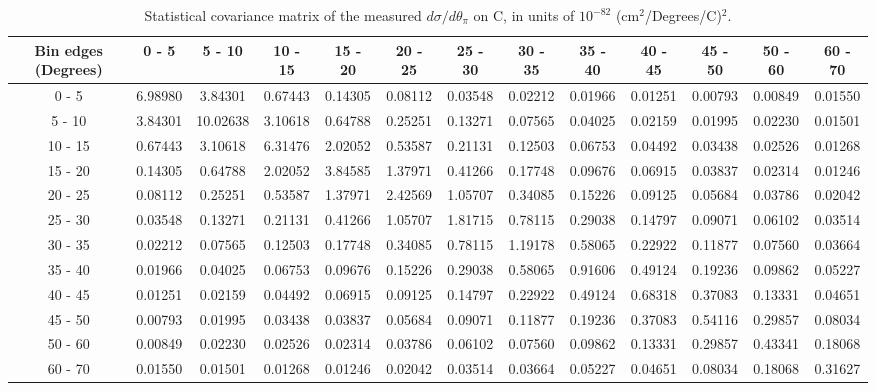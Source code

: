 \documentclass[aps,prl,twocolumn,superscriptaddress,nofootinbib]{revtex4-1}
\begin{document}
\begin{turnpage}
 \begin{table}[h!]
  \centering
  \caption{Statistical covariance matrix of the measured $d\sigma/d\theta_{\pi}$ on C, in units of $10^{-82}$ (cm$^{2}$/Degrees/C)$^{2}$.}
    \begin{tabular}{c||cccccccccccc}
      Bin edges (Degrees) & 0 - 5 & 5 - 10 & 10 - 15 & 15 - 20 & 20 - 25 & 25 - 30 & 30 - 35 & 35 - 40 & 40 - 45 & 45 - 50 & 50 - 60 & 60 - 70 \\
\hline \hline
        0 - 5 &  6.98980 &  3.84301 &  0.67443 &  0.14305 &  0.08112 &  0.03548 &  0.02212 &  0.01966 &  0.01251 &  0.00793 &  0.00849 &  0.01550 \\
       5 - 10 &  3.84301 & 10.02638 &  3.10618 &  0.64788 &  0.25251 &  0.13271 &  0.07565 &  0.04025 &  0.02159 &  0.01995 &  0.02230 &  0.01501 \\
      10 - 15 &  0.67443 &  3.10618 &  6.31476 &  2.02052 &  0.53587 &  0.21131 &  0.12503 &  0.06753 &  0.04492 &  0.03438 &  0.02526 &  0.01268 \\
      15 - 20 &  0.14305 &  0.64788 &  2.02052 &  3.84585 &  1.37971 &  0.41266 &  0.17748 &  0.09676 &  0.06915 &  0.03837 &  0.02314 &  0.01246 \\
      20 - 25 &  0.08112 &  0.25251 &  0.53587 &  1.37971 &  2.42569 &  1.05707 &  0.34085 &  0.15226 &  0.09125 &  0.05684 &  0.03786 &  0.02042 \\
      25 - 30 &  0.03548 &  0.13271 &  0.21131 &  0.41266 &  1.05707 &  1.81715 &  0.78115 &  0.29038 &  0.14797 &  0.09071 &  0.06102 &  0.03514 \\
      30 - 35 &  0.02212 &  0.07565 &  0.12503 &  0.17748 &  0.34085 &  0.78115 &  1.19178 &  0.58065 &  0.22922 &  0.11877 &  0.07560 &  0.03664 \\
      35 - 40 &  0.01966 &  0.04025 &  0.06753 &  0.09676 &  0.15226 &  0.29038 &  0.58065 &  0.91606 &  0.49124 &  0.19236 &  0.09862 &  0.05227 \\
      40 - 45 &  0.01251 &  0.02159 &  0.04492 &  0.06915 &  0.09125 &  0.14797 &  0.22922 &  0.49124 &  0.68318 &  0.37083 &  0.13331 &  0.04651 \\
      45 - 50 &  0.00793 &  0.01995 &  0.03438 &  0.03837 &  0.05684 &  0.09071 &  0.11877 &  0.19236 &  0.37083 &  0.54116 &  0.29857 &  0.08034 \\
      50 - 60 &  0.00849 &  0.02230 &  0.02526 &  0.02314 &  0.03786 &  0.06102 &  0.07560 &  0.09862 &  0.13331 &  0.29857 &  0.43341 &  0.18068 \\
      60 - 70 &  0.01550 &  0.01501 &  0.01268 &  0.01246 &  0.02042 &  0.03514 &  0.03664 &  0.05227 &  0.04651 &  0.08034 &  0.18068 &  0.31627 \\
    \end{tabular}
  \label{tablecov:C_Statistical_ThetaPi}
  \end{table}
\end{turnpage}
\end{document}
